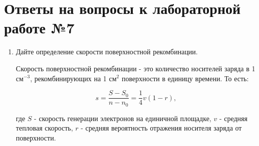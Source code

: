 \documentclass[a4paper, 12pt]{article}
\begin{document}
\section{Ответы на вопросы к лабораторной работе №7}
\begin{enumerate}
    \item Дайте определение скорости поверхностной рекомбинации.

Скорость поверхностной рекомбинации  - это количество носителей заряда в 1 см$^{-3}$, рекомбинирующих на 1 см$^2$ поверхности в единицу времени. То есть:

$$s=\frac{S-S_0}{n-n_0}=\frac{1}{4}v(1-r),$$

где $S$ - скорость генерации электронов на единичной площадке, $v$ - средняя тепловая скорость, $r$ - средняя вероятность отражения носителя заряда от поверхности.
    

\end{enumerate}
\end{document}
